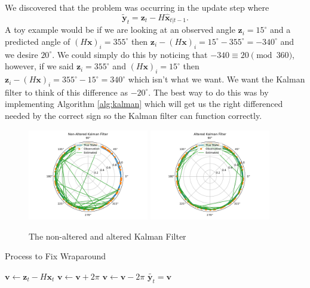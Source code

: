 \documentclass[11pt]{amsart}
\begin{document}
We discovered that the problem was occurring in the update step where \[\mathbf{\tilde{y}}_t = \mathbf{z}_t - H\mathbf{\hat{x}}_{t|t-1}.\]
A toy example would be if we are looking at an observed angle $\mathbf{z}_i = 15^{\circ}$ and a predicted angle of $(H\mathbf{x})_i = 355^{\circ}$ 
then $\mathbf{z}_i - (H\mathbf{x})_i = 15^{\circ} - 355^{\circ} = -340^{\circ}$ and we desire $20^{\circ}$. We could simply do this by noticing that $-340 \equiv 20 \pmod {360}$,
however, if we said $\mathbf{z}_i=355^{\circ}$ and $(H\mathbf{x})_i = 15^{\circ}$ then $\mathbf{z}_i - (H\mathbf{x})_i = 355^{\circ} - 15^{\circ} = 340^{\circ}$ which isn't what we want.
We want the Kalman filter to think of this difference as $-20^{\circ}$. The best way to do this was by implementing Algorithm \ref{alg:kalman} which will get us the right differenced needed by 
the correct sign so the Kalman filter can function correctly.

\begin{figure}[htp]
    \centering
    \includegraphics[width=0.47\textwidth]{non_altered_kalman.pdf}\hfill
    \includegraphics[width=0.47\textwidth]{altered_kalman.pdf}\hfill
    \caption{The non-altered and altered Kalman Filter}
    \label{fig:simple_kalman}
\end{figure}



\begin{algorithm}
    \caption{Process to Fix Wraparound}\label{alg:kalman}    
    \begin{algorithmic}
        \State $\mathbf{v} \gets \mathbf{z}_t - H\mathbf{x}_t$
            \State $\mathbf{v} \gets \mathbf{v} + 2\pi$
            \State $\mathbf{v} \gets \mathbf{v} - 2\pi$
        \EndIf 
        \State $\tilde{\mathbf{y}_t} = \mathbf{v}$ 
        \end{algorithmic}
    \end{algorithm}
\end{document}
